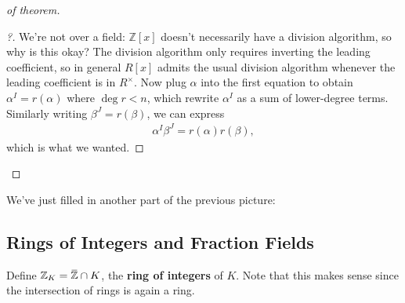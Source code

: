\begin{proof}[of theorem]
\begin{proof}[?]
\hfill\break

We're not over a field: \({\mathbb{Z}}[x]\) doesn't necessarily have a
division algorithm, so why is this okay? The division algorithm only
requires inverting the leading coefficient, so in general \(R[x]\)
admits the usual division algorithm whenever the leading coefficient is
in \(R^{\times}\). Now plug \(\alpha\) into the first equation to obtain
\(\alpha^I = r(\alpha)\) where \(\deg r < n\), which rewrite
\(\alpha^I\) as a sum of lower-degree terms. Similarly writing
\(\beta^J = r(\beta)\), we can express
\begin{align*}
\alpha^I \beta^J = r(\alpha) r(\beta)
,\end{align*}
which is what we wanted.

\end{proof}

\end{proof}

\begin{remark}

We've just filled in another part of the previous picture:

\begin{center}
\end{center}

\end{remark}

\hypertarget{rings-of-integers-and-fraction-fields}{%
\subsection{Rings of Integers and Fraction
Fields}\label{rings-of-integers-and-fraction-fields}}

\begin{definition}

Define
\({\mathbb{Z}}_K = \mkern 1.5mu\overline{\mkern-1.5mu{\mathbb{Z}}\mkern-1.5mu}\mkern 1.5mu\cap K\),
the \textbf{ring of integers} of \(K\). Note that this makes sense since
the intersection of rings is again a ring.

\end{definition}

